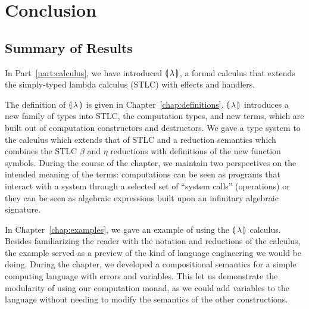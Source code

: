 \chapter*{Conclusion}

\section{Summary of Results}

In Part~\ref{part:calculus}, we have introduced ${\llparenthesis \, \lambda \, \rrparenthesis}$, a formal calculus
that extends the simply-typed lambda calculus (STLC) with effects and
handlers.

The definition of ${\llparenthesis \, \lambda \, \rrparenthesis}$ is given in
Chapter~\ref{chap:definitions}. ${\llparenthesis \, \lambda \, \rrparenthesis}$ introduces a new family of types
into STLC, the computation types, and new terms, which are built out of
computation constructors and destructors. We gave a type system to the
calculus which extends that of STLC and a reduction semantics which
combines the STLC $\beta$ and $\eta$ reductions with definitions of the new
function symbols. During the course of the chapter, we maintain two
perspectives on the intended meaning of the terms: computations can be seen
as programs that interact with a system through a selected set of ``system
calls'' (operations) or they can be seen as algebraic expressions built
upon an infinitary algebraic signature.

In Chapter~\ref{chap:examples}, we gave an example of using the ${\llparenthesis \, \lambda \, \rrparenthesis}$
calculus. Besides familiarizing the reader with the notation and reductions
of the calculus, the example served as a preview of the kind of language
engineering we would be doing. During the chapter, we developed a
compositional semantics for a simple computing language with errors and
variables. This let us demonstrate the modularity of using our computation
monad, as we could add variables to the language without needing to modify
the semantics of the other constructions.

